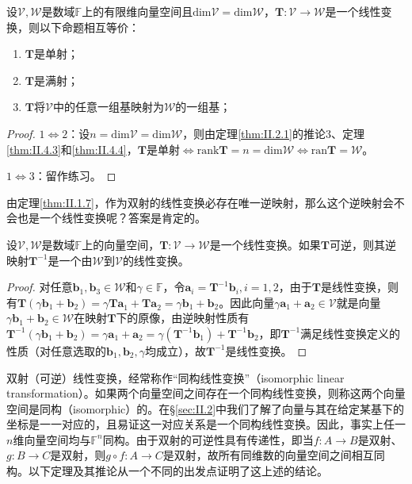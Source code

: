 \documentclass[main.tex]{subfiles}
\begin{document}
\begin{corollary}
设$\mathcal{V},\mathcal{W}$是数域$\mathbb{F}$上的有限维向量空间且$\mathrm{dim}\mathcal{V}=\mathrm{dim}\mathcal{W}$，$\mathbf{T}:\mathcal{V}\rightarrow\mathcal{W}$是一个线性变换，则以下命题相互等价：
\begin{enumerate}
    \item $\mathbf{T}$是单射；
    \item $\mathbf{T}$是满射；
    \item $\mathbf{T}$将$\mathcal{V}$中的任意一组基映射为$\mathcal{W}$的一组基；
\end{enumerate}
\end{corollary}
\begin{proof}
$1\Leftrightarrow 2$：设$n=\mathrm{dim}\mathcal{V}=\mathrm{dim}\mathcal{W}$，则由定理\ref{thm:II.2.1}的推论3、定理\ref{thm:II.4.3}和\ref{thm:II.4.4}，$\mathbf{T}$是单射$\Leftrightarrow\mathrm{rank}\mathbf{T}=n=\mathrm{dim}\mathcal{W}\Leftrightarrow\mathrm{ran}\mathbf{T}=\mathcal{W}$。

$1\Leftrightarrow 3$：留作练习。
\end{proof}

由定理\ref{thm:II.1.7}，作为双射的线性变换必存在唯一逆映射，那么这个逆映射会不会也是一个线性变换呢？答案是肯定的。

\begin{theorem}
设$\mathcal{V},\mathcal{W}$是数域$\mathbb{F}$上的向量空间，$\mathbf{T}:\mathcal{V}\rightarrow\mathcal{W}$是一个线性变换。如果$\mathbf{T}$可逆，则其逆映射$\mathbf{T}^{-1}$是一个由$\mathcal{W}$到$\mathcal{V}$的线性变换。
\end{theorem}
\begin{proof}
对任意$\mathbf{b}_1,\mathbf{b}_3\in\mathcal{W}$和$\gamma\in\mathbb{F}$，令$\mathbf{a}_i=\mathbf{T}^{-1}\mathbf{b}_i,i=1,2$，由于$\mathbf{T}$是线性变换，则有$\mathbf{T}\left(\gamma\mathbf{b}_1+\mathbf{b}_2\right)=\gamma\mathbf{Ta}_1+\mathbf{Ta}_2=\gamma\mathbf{b}_1+\mathbf{b}_2$。因此向量$\gamma\mathbf{a}_1+\mathbf{a}_2\in\mathcal{V}$就是向量$\gamma\mathbf{b}_1+\mathbf{b}_2\in\mathcal{W}$在映射$\mathbf{T}$下的原像，由逆映射性质有$\mathbf{T}^{-1}\left(\gamma\mathbf{b}_1+\mathbf{b}_2\right)=\gamma\mathbf{a}_1+\mathbf{a}_2=\gamma\left(\mathbf{T}^{-1}\mathbf{b}_1\right)+\mathbf{T}^{-1}\mathbf{b}_2$，即$\mathbf{T}^{-1}$满足线性变换定义的性质（对任意选取的$\mathbf{b}_1,\mathbf{b}_2,\gamma$均成立），故$\mathbf{T}^{-1}$是线性变换。
\end{proof}

双射（可逆）线性变换，经常称作“同构线性变换”（isomorphic linear transformation）。如果两个向量空间之间存在一个同构线性变换，则称这两个向量空间是同构（isomorphic）的。在\S\ref{sec:II.2}中我们了解了向量与其在给定某基下的坐标是一一对应的，且易证这一对应关系是一个同构线性变换。因此，事实上任一$n$维向量空间均与$\mathbb{F}^n$同构。由于双射的可逆性具有传递性，即当$f:A\rightarrow B$是双射、$g:B\rightarrow C$是双射，则$g\circ f:A\rightarrow C$是双射，故所有同维数的向量空间之间相互同构。以下定理及其推论从一个不同的出发点证明了这上述的结论。
\end{document}
